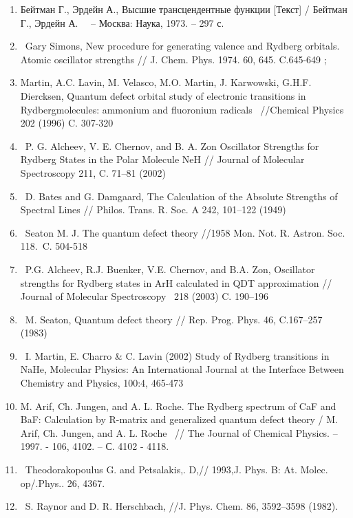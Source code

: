 \liststyleWWNumi
\setcounter{saveenum}{\value{enumi}}
\begin{enumerate}
\setcounter{enumi}{\value{saveenum}}
\item Бейтман Г., Эрдейн
А., Высшие трансцендентные
функции [Текст] /
Бейтман Г., Эрдейн
А. \ \ {}-- Москва: Наука, 1973. -- 297
с.
\item \foreignlanguage{english}{\ Gary Simons, New procedure for generating valence and Rydberg orbitals. Atomic
oscillator strengths // J. Chem. Phys. 1974. 60, 645. C.645-649 ;}
\item \foreignlanguage{english}{Martin, A.C. Lavin, M. Velasco, M.O. Martin, J. Karwowski, G.H.F. Diercksen, Quantum
defect orbital study of electronic transitions in Rydbergmolecules: ammonium and fluoronium radicals \ //Chemical
Physics 202 (1996) C. 307-320}
\item \foreignlanguage{english}{\ P. G. Alcheev, V. E. Chernov, and B. A. Zon Oscillator Strengths for Rydberg States in
the Polar Molecule NeH // Journal of Molecular Spectroscopy 211, C. 71--81 (2002)}
\item \foreignlanguage{english}{\ D. Bates and G. Damgaard, The Calculation of the Absolute Strengths of Spectral Lines
// Philos. Trans. R. Soc. A 242, 101--122 (1949)}
\item \foreignlanguage{english}{\ Seaton M. J. The quantum defect theory //1958 Mon. Not. R. Astron. Soc. 118.~C.
504-518}
\item \foreignlanguage{english}{\ P.G. Alcheev, R.J. Buenker, V.E. Chernov, and B.A. Zon, Oscillator strengths for
Rydberg states in ArH calculated in QDT approximation // Journal of Molecular Spectroscopy \ 218 (2003) C. 190--196}
\item \foreignlanguage{english}{\ M. Seaton, Quantum defect theory // Rep. Prog. Phys. 46, C.167--257 (1983)}
\item \foreignlanguage{english}{\ I. Martin, E. Charro \& C. Lavin (2002) Study of Rydberg transitions in NaHe,
Molecular Physics: An International Journal at the Interface Between Chemistry and Physics, 100:4, 465-473}
\item \foreignlanguage{english}{M. Arif, Ch. Jungen, and A. L. Roche. The Rydberg spectrum of CaF and BaF: Calculation
by R-matrix and generalized quantum defect theory / M. Arif, Ch. Jungen, and A. L. Roche \ // The Journal of Chemical
Physics. -- 1997. - 106, 4102. -- }С\foreignlanguage{english}{. 4102 - 4118.}
\item \foreignlanguage{english}{\ Theodorakopoulus G. and Petsalakis,. D,// 1993,J. Phys. B: At. Molec. op/.Phys.. 26,
4367.}
\item \foreignlanguage{english}{\ S. Raynor and D. R. Herschbach, //J. Phys. Chem. 86, 3592--3598 (1982).}
\end{enumerate}

